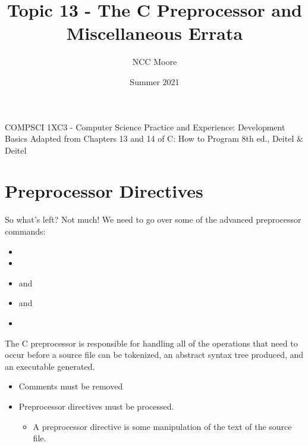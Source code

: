 \documentclass[11pt]{beamer}
\author{NCC Moore}
\title{Topic 13 - The C Preprocessor and Miscellaneous Errata}
\institute{McMaster University}
\date{Summer 2021}
\let\OldTexttt\texttt
\renewcommand{\texttt}[1]{\OldTexttt{\color{teal}{#1}}}
\begin{document}
\begin{frame}
\center
COMPSCI 1XC3 - Computer Science Practice and Experience:
Development Basics
\titlepage
Adapted from Chapters 13 and 14 of C: How to Program 8th ed., Deitel \& Deitel
\end{frame}

\begin{frame}
\tableofcontents
\end{frame}

\section[Preproc]{Preprocessor Directives}
\begin{frame}{So what's left?}
Not much! We need to go over some of the advanced preprocessor commands:
\begin{itemize}
\item \texttt{\#define}
\item \texttt{\#undef}
\item \texttt{\#if} and \texttt{\#endif}
\item \texttt{\#error} and \texttt{\#pragma}
\item \texttt{\#line}
\end{itemize}
The C preprocessor is responsible for handling all of the operations that need to occur before a source file can be tokenized, an abstract syntax tree produced, and an executable generated.
\begin{itemize}
\item Comments must be removed
\item Preprocessor directives must be processed.
\begin{itemize}
\item A preprocessor directive is some manipulation of the text of the source file.  
\end{itemize}
\end{itemize}
\end{frame}
\end{document}
